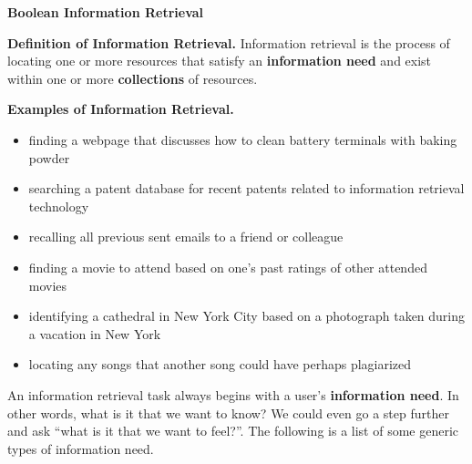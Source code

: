 \documentclass [12pt]{article}
\begin{document}
\begin{center}{\bf \large Boolean Information Retrieval}\end{center}

\normalsize

\textbf{Definition of Information Retrieval.} Information retrieval is the process of locating
one or more resources that satisfy an 
\textbf{information need} and exist within one or more \textbf{collections} of resources.

\textbf{Examples of Information Retrieval.} 
\begin{itemize}
\item finding a webpage that discusses how to clean battery terminals with baking powder
\item searching a patent database for recent patents related to information retrieval
technology
\item recalling all previous sent emails to a friend or colleague
\item finding a movie to attend based on one's past ratings of other attended movies
\item identifying a cathedral in New York City based on a photograph taken during a vacation in New York
\item locating any songs that another song could have perhaps plagiarized
\end{itemize}

An information retrieval task always begins with a user's \textbf{information need}. In other words,
what is it that we want to know? We could even go a step further and ask ``what is it that we want to feel?''.
The following is a list of some generic types of information need.
\end{document}
